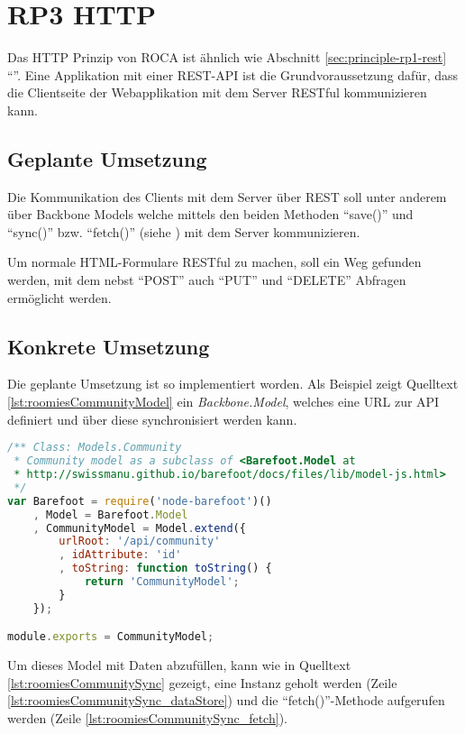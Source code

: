 \section{RP3 HTTP}
\label{sec:principle-rp3-http}

Das HTTP Prinzip von ROCA ist ähnlich wie Abschnitt \ref{sec:principle-rp1-rest} ``''.
Eine Applikation mit einer \gls{REST}-API ist die Grundvoraussetzung dafür, dass die Clientseite der Webapplikation mit dem Server \gls{RESTful} kommunizieren kann.

\subsection*{Geplante Umsetzung}
Die Kommunikation des Clients mit dem Server über \gls{REST} soll unter anderem über Backbone Models welche mittels den beiden Methoden ``save()'' und ``sync()'' bzw. ``fetch()'' (siehe \cite{BackboneSync}) mit dem Server kommunizieren.

Um normale HTML-Formulare \gls{RESTful} zu machen, soll ein Weg gefunden werden, mit dem nebst ``POST'' auch ``PUT'' und ``DELETE'' Abfragen ermöglicht werden.

\subsection*{Konkrete Umsetzung}
Die geplante Umsetzung ist so implementiert worden. Als Beispiel zeigt Quelltext \ref{lst:roomiesCommunityModel} ein \emph{Backbone.Model}, welches eine URL zur API definiert und über diese synchronisiert werden kann.

\begin{lstlisting}[language=JavaScript, caption=Community Model \cite{roomiesCommunityModel}, label=lst:roomiesCommunityModel]
/** Class: Models.Community
 * Community model as a subclass of <Barefoot.Model at
 * http://swissmanu.github.io/barefoot/docs/files/lib/model-js.html>
 */
var Barefoot = require('node-barefoot')()
	, Model = Barefoot.Model
	, CommunityModel = Model.extend({
		urlRoot: '/api/community'
		, idAttribute: 'id'
		, toString: function toString() {
			return 'CommunityModel';
		}
	});

module.exports = CommunityModel;
\end{lstlisting}

Um dieses Model mit Daten abzufüllen, kann wie in Quelltext \ref{lst:roomiesCommunitySync} gezeigt, eine Instanz geholt werden (Zeile \ref{lst:roomiesCommunitySync_dataStore}) und die ``fetch()''-Methode aufgerufen werden (Zeile \ref{lst:roomiesCommunitySync_fetch}).

